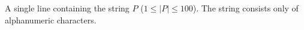 A single line containing the string $P$ ($1 \le |P| \le 100$). The string consists only of alphanumeric characters.